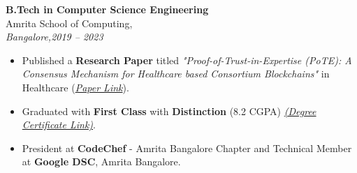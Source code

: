\documentclass[a4paper,12pt]{article}
\begin{document}
\textbf{B.Tech in Computer Science Engineering} \\
{Amrita School of Computing},  \\ \textit{Bangalore,2019 -- 2023} 
\begin{itemize}[leftmargin=1.5em]
    \item Published a \textbf{Research Paper} titled \textit{"Proof-of-Trust-in-Expertise (PoTE): A Consensus Mechanism for Healthcare based Consortium Blockchains"} in Healthcare (\textit{\href{https://papers.ssrn.com/sol3/papers.cfm?abstract_id=4804243}{Paper Link}}).
    \item Graduated with \textbf{First Class} with \textbf{Distinction} (8.2 CGPA) \textit{\href{https://drive.google.com/drive/folders/1Hu5mrXyz4nnYDJhT7x9IuLwLyBzCwkKB}{(Degree Certificate Link)}}.
    \item President at \textbf{CodeChef} - Amrita Bangalore Chapter and Technical Member at \textbf{Google DSC}, Amrita Bangalore.
\end{itemize}
\end{document}
